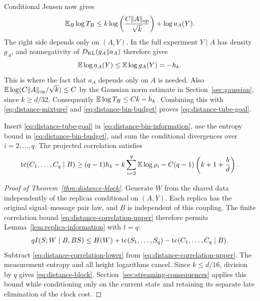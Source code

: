 Conditional Jensen now gives
\[
 \mathbb E_B\log T_B\le
 k\log\left(\frac{C\lVert A\rVert_{\mathrm{op}}}{\sqrt k}\right)+\log a_A(Y).
\]
The right side depends only on $(A,Y)$. In the full experiment
$Y\mid A$ has density $g_A$, and nonnegativity of
$D_{\mathrm{KL}}(g_A\Vert a_A)$ therefore gives
\begin{equation}\label{eq:distance-reference-density}
 \mathbb E\log a_A(Y)\le\mathbb E\log g_A(Y)=-h_k.
\end{equation}
This is where the fact that $a_A$ depends only on $A$ is needed.
Also $\mathbb E\log(C\lVert A\rVert_{\mathrm{op}}/\sqrt k)\le C$ by the Gaussian norm
estimate in Section~\ref{sec:gaussian}, since $k\ge d/32$. Consequently
$\mathbb E\log T_B\le Ck-h_k$. Combining this with
\eqref{eq:distance-mixture} and \eqref{eq:distance-bin-budget} proves
\eqref{eq:distance-tube-goal}.

Insert \eqref{eq:distance-tube-goal} in
\eqref{eq:distance-bin-information}, use the entropy bound
in \eqref{eq:distance-bin-budget}, and sum the conditional divergences
over $i=2,\ldots,q$. The projected correlation satisfies
\begin{equation}\label{eq:distance-correlation-lower}
 \operatorname{tc}(C_1,\ldots,C_q\mid B)
 \ge(q-1)h_k-k\sum_{i=2}^q\mathbb E\log\rho_i
          -C(q-1)\left(k+1+\frac bd\right).
\end{equation}

\begin{proof}[Proof of Theorem~\ref{thm:distance-block}]
Generate $W$ from the shared data independently of the replicas conditional
on $(A,Y)$. Each replica has the original signal--message pair law, and
$B$ is independent of this coupling. The finite correlation bound
\eqref{eq:distance-correlation-upper} therefore permits
Lemma~\ref{lem:replica-information} with $t=q$:
\[
 qI(S;W\mid B,BS)
 \le H(W)+\operatorname{tc}(S_1,\ldots,S_q)-\operatorname{tc}(C_1,\ldots,C_q\mid B).
\]
Subtract \eqref{eq:distance-correlation-lower} from
\eqref{eq:distance-correlation-upper}. The measurement entropy and all
height logarithms cancel. Since $k\le d/16$, division by $q$ gives
\eqref{eq:distance-block}. Section~\ref{sec:streaming-consequences} applies
this bound while conditioning only on the current state and retaining its
separate late elimination of the clock cost.
\end{proof}
